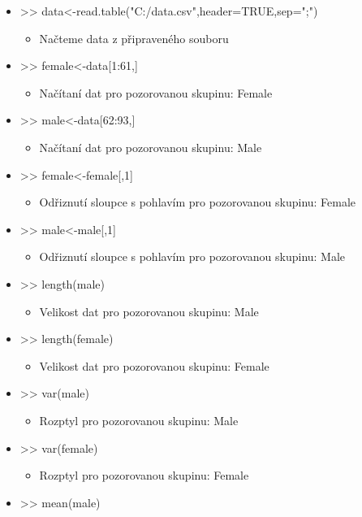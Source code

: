 \documentclass[paper=a4, fontsize=12pt]{scrartcl}
\numberwithin{equation}{section}		%
\numberwithin{figure}{section}			%
\numberwithin{table}{section}				%
\begin{document}
\begin{itemize}
	\item >> data<-read.table("C:/data.csv",header=TRUE,sep=";")
		\begin{itemize}
		\item Načteme data z připraveného souboru
		\end{itemize}
	\item >> female<-data[1:61,]
		\begin{itemize}
		\item Načítaní dat pro pozorovanou skupinu: Female
		\end{itemize}
	\item >> male<-data[62:93,]
		\begin{itemize}
		\item Načítaní dat pro pozorovanou skupinu: Male
		\end{itemize}
	\item >> female<-female[,1]
		\begin{itemize}
		\item Odřiznutí sloupce s pohlavím pro pozorovanou skupinu: Female
		\end{itemize}
	\item >> male<-male[,1]
		\begin{itemize}
		\item Odřiznutí sloupce s pohlavím pro pozorovanou skupinu: Male
		\end{itemize}
	\item >> length(male)
		\begin{itemize}
		\item Velikost dat pro pozorovanou skupinu: Male
		\end{itemize}
	\item >> length(female)
		\begin{itemize}
		\item Velikost dat pro pozorovanou skupinu: Female
		\end{itemize}
	\item >> var(male)
		\begin{itemize}
		\item Rozptyl pro pozorovanou skupinu: Male
		\end{itemize}
	\item >> var(female)
		\begin{itemize}
		\item Rozptyl pro pozorovanou skupinu: Female
		\end{itemize}
	\item >> mean(male)

\end{itemize}
\end{document}
